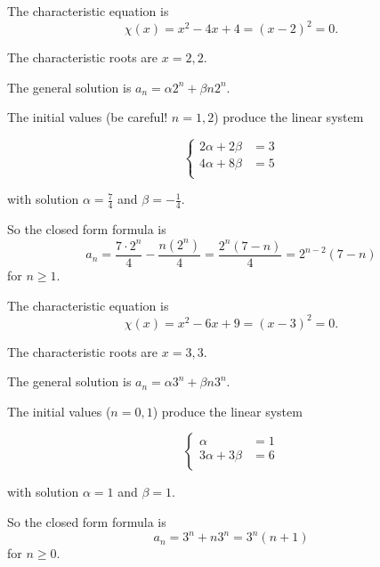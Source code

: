 \begin{Solution}{36.5}

The characteristic equation is 
\[
\chi(x) = x^{2} - 4x +4 = (x-2)^{2} =0.
\] 

The characteristic roots are $x = 2, 2$.

The general solution is $a_{n}=\alpha 2^{n} + \beta n2^{n}$.

The initial values (be careful! $n = 1,2$)  produce the linear system

\[
  \left\{
    \begin{aligned}
     2\alpha + 2\beta &= 3\\
     4\alpha + 8\beta &= 5\\
     \end{aligned}
   \right.
\]
   
with solution $\alpha = \frac{7}{4}$ and $\beta = -\frac{1}{4}$.

So the closed form formula is 
\[
a_{n} = \frac{7\cdot2^{n}}{4} -\frac{n(2^{n})}{4} = \frac{2^{n}(7-n)}{4}= 2^{n-2}(7-n)
\]   
for $n\geq 1$.



\end{Solution}

\begin{Solution}{36.6}

The characteristic equation is 
\[
\chi(x) = x^{2} - 6x +9 = (x-3)^{2} =0.
\] 

The characteristic roots are $x = 3, 3$.

The general solution is $a_{n}=\alpha 3^{n} + \beta n3^{n}$.

The initial values ($n = 0,1$)  produce the linear system

\[
  \left\{
    \begin{aligned}
     \alpha  &= 1\\
     3\alpha + 3\beta &= 6\\
     \end{aligned}
   \right.
\]
   
with solution $\alpha = 1$ and $\beta = 1$.

So the closed form formula is 
\[
a_{n} = 3^{n} +n3^{n} = 3^{n}(n+1)
\]   
for $n\geq 0$.


\end{Solution}

